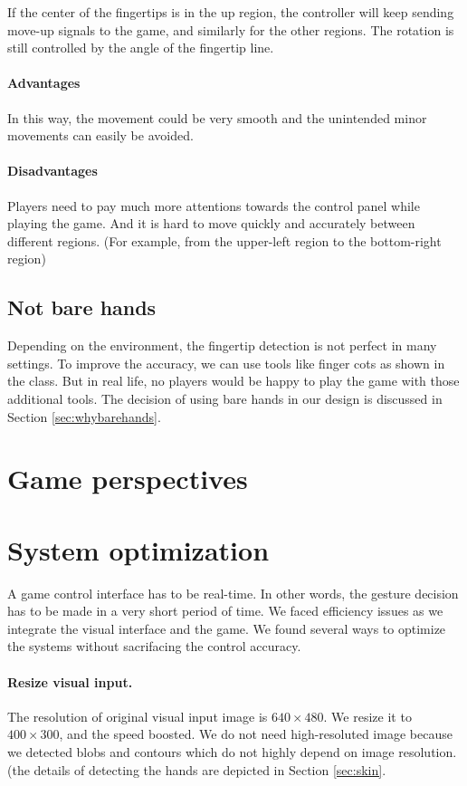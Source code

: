 \documentclass[10pt,twocolumn,letterpaper]{article}
\begin{document}
If the center of the fingertips is in the up region, the controller 
will keep sending move-up signals to the game, and similarly for the other 
regions. The rotation is still controlled by the angle of the fingertip line.
\paragraph{Advantages}
In this way, the movement could be very smooth and the unintended minor movements can easily be avoided.
\paragraph{Disadvantages}
Players need to pay much more attentions towards the control panel while playing the game. And it is hard to move quickly and accurately between different regions. (For example, from the upper-left region to the bottom-right region)

\subsection{Not bare hands}
Depending on the environment, the fingertip detection is not perfect in many settings. 
To improve the accuracy, we can use tools like finger cots as shown in the class. 
But in real life, no players would be happy to play the game with those additional tools. 
The decision of using bare hands in our design is discussed in Section \ref{sec:whybarehands}.

\section{Game perspectives}

\section{System optimization}
A game control interface has to be real-time. In other words, 
the gesture decision has to be made in a very short period of time. 
We faced efficiency issues as we integrate the visual interface and 
the game. We found several ways to optimize the systems without 
sacrifacing the control accuracy.

\paragraph{Resize visual input.} The resolution of 
original visual input image is $640 \times 480$. 
We resize it to $400 \times 300$, and the speed boosted.
We do not need high-resoluted image because we detected 
blobs and contours which do not highly depend on image resolution. 
(the details of detecting the hands are depicted in Section 
\ref{sec:skin}.
\end{document}
